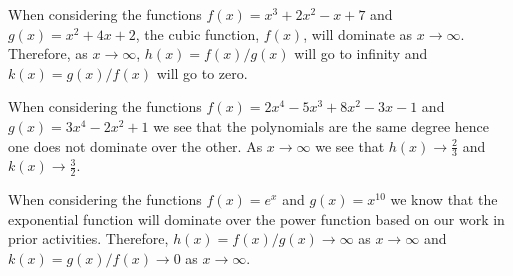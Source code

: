 \begin{activitySolution}
   \ba
        \item When considering the functions $f(x) = x^3 + 2x^2 - x + 7$ and $g(x) =
            x^2+4x+2$, the cubic function, $f(x)$, will dominate as $x \to \infty$.
            Therefore, as $x \to \infty$, $h(x) = f(x)/g(x)$ will go to infinity and $k(x)
            = g(x)/f(x)$ will go to zero.
        \item When considering the functions $f(x) = 2x^{4} - 5x^{3} + 8x^{2} - 3x - 1$
            and $g(x) = 3x^{4} - 2x^{2} + 1$ we see that the polynomials are the same
            degree hence one does not dominate over the other.  As $x\to\infty$ we see
            that $h(x) \to \frac{2}{3}$ and $k(x) \to \frac{3}{2}$.
        \item When considering the functions $f(x) = e^x$ and $g(x) = x^{10}$ we know that
            the exponential function will dominate over the power function based on our
            work in prior activities.  Therefore, $h(x) = f(x)/g(x) \to \infty$ as
            $x\to\infty$ and $k(x) = g(x)/f(x) \to 0$ as $x \to \infty$.

   \ea
\end{activitySolution}

\aftera
